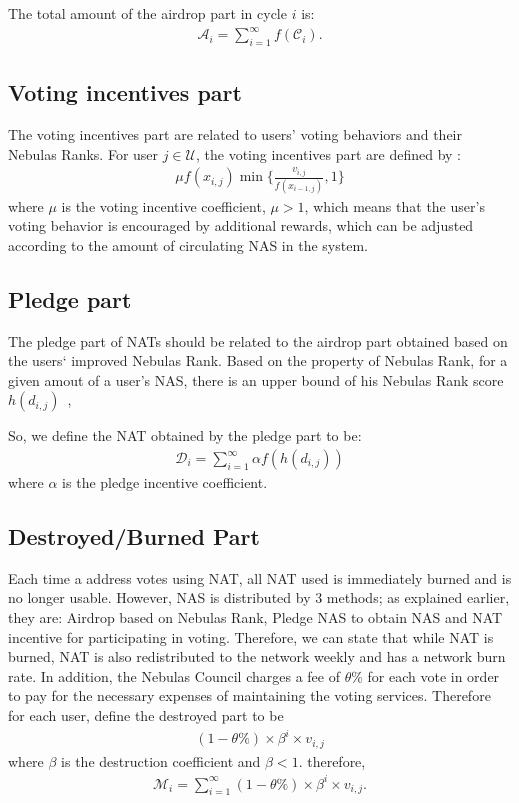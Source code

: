 The total amount of the airdrop part  in cycle $i$ is:
\begin{align}
\mathcal{A}_i = \sum_{i=1}^{\infty}f(\mathcal{C}_i).
\end{align}

\subsection{Voting incentives part}
The voting incentives part are related to users' voting behaviors and their Nebulas Ranks. For user $j \in \mathcal{U}$, the voting incentives part are defined by :
\begin{align}
\mu f(x_{i,j}) \min\{\frac{v_{i,j}}{f(x_{i-1,j})},1\}
\end{align}
\noindent where $\mu$ is the voting incentive coefficient, $\mu > 1$, which means that the user's voting behavior is encouraged by additional rewards, which can be adjusted according to the amount of circulating NAS in the system.

\subsection{Pledge part}
The pledge part of NATs should be related to the airdrop part obtained based on the users‘ improved Nebulas Rank. Based on the property of Nebulas Rank, for a given amout of a user's NAS, there is an upper bound of his Nebulas Rank score $h(d_{i,j})$~\cite{ImproveNR},

So, we define the NAT obtained by the pledge part to be:
\begin{align}
\mathcal{D}_i = \sum_{i=1}^{\infty}\alpha f(h(d_{i,j}))
\end{align}
\noindent where $\alpha$ is the pledge incentive coefficient.


\subsection{Destroyed/Burned Part}
\label{burn}
Each time a address votes using NAT, all NAT used is immediately burned and is no longer usable. However, NAS is distributed by 3 methods; as explained earlier, they are: Airdrop based on Nebulas Rank, Pledge NAS to obtain NAS and NAT incentive for participating in voting. Therefore, we can state that while NAT is burned, NAT is also redistributed to the network weekly and has a network burn rate. In addition, the Nebulas Council charges a fee of $\theta\%$ for each vote in order to pay for the necessary expenses of maintaining the voting services. Therefore for each user, define the destroyed part to be\begin{align}
(1-\theta\%) \times \beta^i \times v_{i,j}
\end{align}
\noindent where $\beta$ is the destruction coefficient and $\beta < 1$. therefore,
\begin{align}
    \mathcal{M}_i = \sum_{i=1}^{\infty} (1-\theta\%) \times \beta^i \times v_{i,j} .
\end{align}

